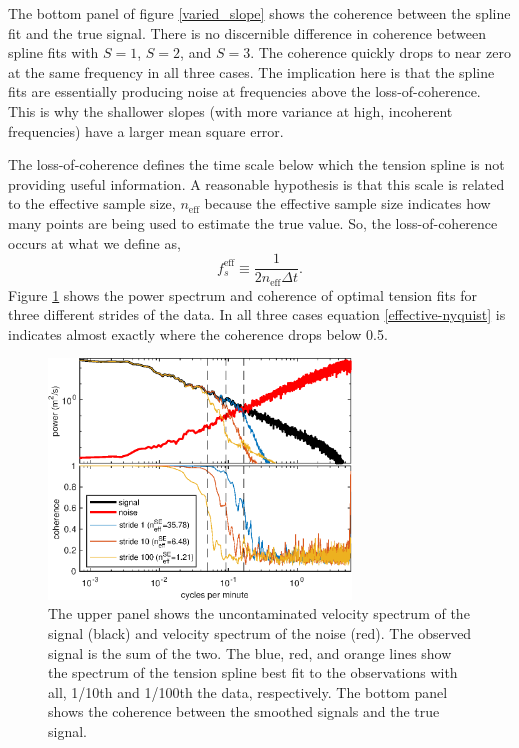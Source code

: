 \documentclass[10pt,journal]{IEEEtran}
\begin{document}
The bottom panel of figure \ref{varied_slope} shows the coherence between the spline fit and the true signal. There is no discernible difference in coherence between spline fits with $S=1$, $S=2$, and $S=3$. The coherence quickly drops to near zero at the same frequency in all three cases. The implication here is that the spline fits are essentially producing noise at frequencies above the loss-of-coherence. This is why the shallower slopes (with more variance at high, incoherent frequencies) have a larger mean square error.

The loss-of-coherence defines the time scale below which the tension spline is not providing useful information. A reasonable hypothesis is that this scale is related to the effective sample size, $n_{\textrm{eff}}$ because the effective sample size indicates how many points are being used to estimate the true value. So, the loss-of-coherence occurs at what we define as,
\begin{equation}
\label{effective-nyquist}
    f_s^{\textrm{eff}} \equiv \frac{1}{2 n_{\textrm{eff}} \Delta t}.
\end{equation}
Figure \ref{synthetic_process_and_spectrum} shows the power spectrum and coherence of optimal tension fits for three different strides of the data. In all three cases equation \ref{effective-nyquist} is indicates almost exactly where the coherence drops below 0.5.

\begin{figure}
  \centerline{\includegraphics[width=19pc,angle=0]{figures/synthetic_process_and_spectrum_slope2degree3}}
  
  \caption{The upper panel shows the uncontaminated velocity spectrum of the signal (black) and velocity spectrum of the noise (red). The observed signal is the sum of the two. The blue, red, and orange lines show the spectrum of the tension spline best fit to the observations with all, 1/10th and 1/100th the data, respectively. The bottom panel shows the coherence between the smoothed signals and the true signal.}
  \label{synthetic_process_and_spectrum}
\end{figure}
\end{document}
